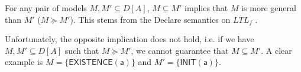 \begin{remark}{}\label{re:subset-generality}
For any pair of models $M, M'\subseteq D[A]$, $M\subseteq M'$ implies that $M$ is more general than $M'$ ($M\succeq M'$). This stems from the Declare semantics \cite{2008-Pesic} on $LTL_f$ \cite{DBLP:conf/ijcai/GiacomoV13}.
\end{remark} 

Unfortunately, the opposite implication does not hold, i.e. if we have $M, M'\subseteq D[A]$ such that $M\succeq M'$, we cannot guarantee that $M\subseteq M'$. A clear example is $M=\{\mathsf{EXISTENCE(a)}\}$ and $M'=\{\mathsf{INIT(a)}\}$.




